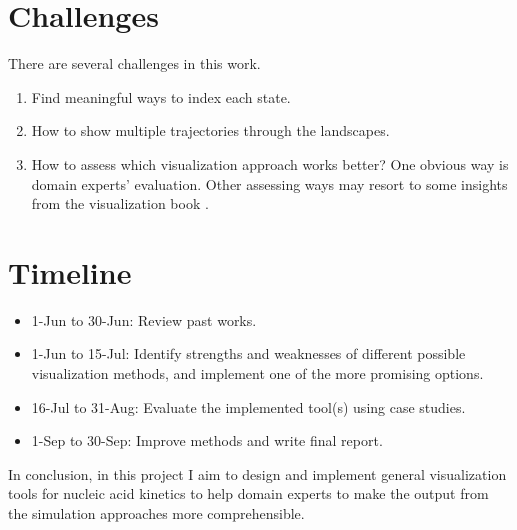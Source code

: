\documentclass{article}
\begin{document}
\begin{enumerate}
%	
	
	
\end{enumerate}


\section*{Challenges}
There are several challenges in this work.
\begin{enumerate}
	\item Find meaningful ways to index each state.
	\item How to show multiple trajectories through the landscapes.
	\item How to assess which visualization approach works better? One obvious way is domain experts' evaluation. Other assessing ways may resort to some insights from the visualization book \cite{tamara}.
\end{enumerate}


\section*{Timeline}
\begin{itemize}
	\item 1-Jun to 30-Jun: Review past works.
	\item 1-Jun to 15-Jul: Identify strengths and weaknesses of different possible visualization methods, and implement one of the more promising options.
	\item 16-Jul to 31-Aug: Evaluate the implemented tool(s) using case studies.
	\item 1-Sep to 30-Sep: Improve methods and write final report.
\end{itemize}


In conclusion, in this project I aim to design and implement general visualization tools for nucleic acid kinetics to help domain experts to make the output from the simulation approaches more comprehensible.


\clearpage

{}
\end{document}
